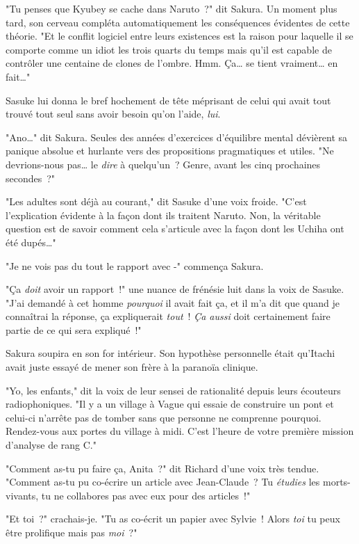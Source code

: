 "Tu penses que Kyubey se cache dans Naruto~?" dit Sakura. Un moment plus tard, son cerveau compléta automatiquement les conséquences évidentes de cette théorie. "Et le conflit logiciel entre leurs existences est la raison pour laquelle il se comporte comme un idiot les trois quarts du temps mais qu'il est capable de contrôler une centaine de clones de l'ombre. Hmm. Ça… se tient vraiment… en fait…"

Sasuke lui donna le bref hochement de tête méprisant de celui qui avait tout trouvé tout seul sans avoir besoin qu'on l'aide, \emph{lui}.

"Ano…" dit Sakura. Seules des années d'exercices d'équilibre mental dévièrent sa panique absolue et hurlante vers des propositions pragmatiques et utiles. "Ne devrions-nous pas… le \emph{dire} à quelqu'un~? Genre, avant les cinq prochaines secondes~?"

"Les adultes sont déjà au courant," dit Sasuke d'une voix froide. "C'est l'explication évidente à la façon dont ils traitent Naruto. Non, la véritable question est de savoir comment cela s'articule avec la façon dont les Uchiha ont été dupés…"

"Je ne vois pas du tout le rapport avec -" commença Sakura.

"Ça \emph{doit} avoir un rapport~!" une nuance de frénésie luit dans la voix de Sasuke. "J'ai demandé à cet homme \emph{pourquoi} il avait fait ça, et il m'a dit que quand je connaîtrai la réponse, ça expliquerait \emph{tout}~! \emph{Ça aussi} doit certainement faire partie de ce qui sera expliqué~!"

Sakura soupira en son for intérieur. Son hypothèse personnelle était qu'Itachi avait juste essayé de mener son frère à la paranoïa clinique.

"Yo, les enfants," dit la voix de leur sensei de rationalité depuis leurs écouteurs radiophoniques. "Il y a un village à Vague qui essaie de construire un pont et celui-ci n'arrête pas de tomber sans que personne ne comprenne pourquoi. Rendez-vous aux portes du village à midi. C'est l'heure de votre première mission d'analyse de rang C."

\clearpage
{}

"Comment as-tu pu faire ça, Anita~?" dit Richard d'une voix très tendue. "Comment as-tu pu co-écrire un article avec Jean-Claude~? Tu \emph{étudies} les morts-vivants, tu ne collabores pas avec eux pour des articles~!"

"Et toi~?" crachais-je. "Tu as co-écrit un papier avec Sylvie~! Alors \emph{toi} tu peux être prolifique mais pas \emph{moi}~?"


